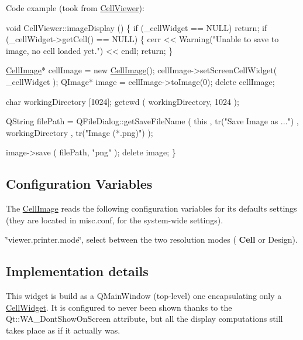 Code example (took from \mbox{\hyperlink{classHurricane_1_1CellViewer}{Cell\+Viewer}})\+: 
\begin{DoxyCode}
\textcolor{keywordtype}{void}  CellViewer::imageDisplay ()
\{
  \textcolor{keywordflow}{if} (\_cellWidget == NULL) \textcolor{keywordflow}{return};
  \textcolor{keywordflow}{if} (\_cellWidget->getCell() == NULL) \{
    cerr << Warning(\textcolor{stringliteral}{"Unable to save to image, no cell loaded yet."}) << endl;
    \textcolor{keywordflow}{return};
  \}

  \mbox{\hyperlink{classHurricane_1_1CellImage_a3f73f1a3a90d4625a5e0b31711affc34}{CellImage}}* cellImage = \textcolor{keyword}{new} \mbox{\hyperlink{classHurricane_1_1CellImage_a3f73f1a3a90d4625a5e0b31711affc34}{CellImage}}();
  cellImage->setScreenCellWidget( \_cellWidget );
  QImage* image = cellImage->toImage(0);
  \textcolor{keyword}{delete} cellImage;

  \textcolor{keywordtype}{char} workingDirectory [1024];
  getcwd ( workingDirectory, 1024 );

  QString filePath = QFileDialog::getSaveFileName ( \textcolor{keyword}{this}
                                                  , tr(\textcolor{stringliteral}{"Save Image as ..."})
                                                  , workingDirectory
                                                  , tr(\textcolor{stringliteral}{"Image (*.png)"})
                                                  );

  image->save ( filePath, \textcolor{stringliteral}{"png"} );
  \textcolor{keyword}{delete} image;
\}
\end{DoxyCode}
\hypertarget{classHurricane_1_1CellImage_secImageConfiguration}{}\subsection{Configuration Variables}\label{classHurricane_1_1CellImage_secImageConfiguration}
The \mbox{\hyperlink{classHurricane_1_1CellImage}{Cell\+Image}} reads the following configuration variables for it\textquotesingle{}s defaults settings (they are located in {\ttfamily misc.\+conf}, for the system-\/wide settings). 
\begin{DoxyItemize}
\item {\ttfamily \char`\"{}viewer.\+printer.\+mode\char`\"{}}, select between the two resolution modes (\textbf{ Cell} or Design). 
\end{DoxyItemize}\hypertarget{classHurricane_1_1CellImage_secImageImplDetails}{}\subsection{Implementation details}\label{classHurricane_1_1CellImage_secImageImplDetails}
This widget is build as a Q\+Main\+Window (top-\/level) one encapsulating only a \mbox{\hyperlink{classHurricane_1_1CellWidget}{Cell\+Widget}}. It is configured to never been shown thanks to the {\ttfamily Qt\+::\+W\+A\+\_\+\+Dont\+Show\+On\+Screen} attribute, but all the display computations still takes place as if it actually was.

